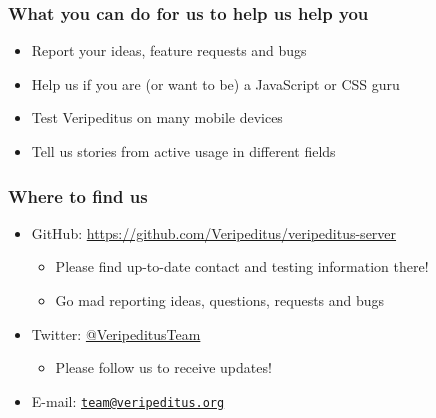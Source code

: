 \documentclass[aspectratio=43]{beamer}
\begin{document}
 \begin{frame}
  \frametitle{What you can do for us to help us help you}

  \begin{itemize}
   \item{Report your ideas, feature requests and bugs}
   \item{Help us if you are (or want to be) a JavaScript or CSS guru}
   \item{Test Veripeditus on many mobile devices}
   \item{Tell us stories from active usage in different fields}
  \end{itemize}
 \end{frame}


 \begin{frame}
  \frametitle{Where to find us}

  \begin{itemize}
   \item{GitHub: \url{https://github.com/Veripeditus/veripeditus-server}
    \begin{itemize}
     \item{Please find up-to-date contact and testing information there!}
     \item{Go mad reporting ideas, questions, requests and bugs}
    \end{itemize}
   }
   \item{Twitter: \href{https://www.twitter.com/VeripeditusTeam}{@VeripeditusTeam}
    \begin{itemize}
     \item{Please follow us to receive updates!}
    \end{itemize}
   }
   \item{E-mail: \href{mailto:team@veripeditus.org}{\nolinkurl{team@veripeditus.org}} }
  \end{itemize}
 \end{frame}

\end{document}
